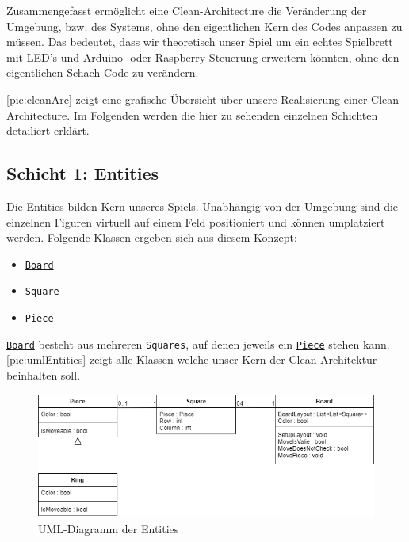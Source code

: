 \documentclass[
10pt, %
a4paper, %
oneside, %
headinclude,footinclude, %
BCOR5mm, %
]{scrartcl}
\begin{document}
\begin{onehalfspace}
Zusammengefasst ermöglicht eine Clean-Architecture die Veränderung der Umgebung, bzw. des Systems, ohne den eigentlichen Kern des Codes anpassen zu müssen.
Das bedeutet, dass wir theoretisch unser Spiel um ein echtes Spielbrett mit LED's und Arduino- oder Raspberry-Steuerung erweitern könnten, ohne den eigentlichen Schach-Code zu verändern.

\autoref{pic:cleanArc} zeigt eine grafische Übersicht über unsere Realisierung einer Clean-Architecture. Im Folgenden werden die hier zu sehenden einzelnen Schichten detailiert erklärt.

\newpage
\subsection{Schicht 1: Entities}
Die Entities bilden Kern unseres Spiels. Unabhängig von der Umgebung sind die einzelnen Figuren virtuell auf einem Feld positioniert und können umplatziert werden.
Folgende Klassen ergeben sich aus diesem Konzept: 

\begin{center}
	\begin{itemize}
		\item \texttt{\href{https://github.com/schmida736/Chess-AdvancedSE/blob/main/Chess-AdvancedSE/Game\%20Elements/Board.cs}{Board}}
		\item \texttt{\href{https://github.com/schmida736/Chess-AdvancedSE/blob/main/Chess-AdvancedSE/Game\%20Elements/Square.cs}{Square}}
		\item \texttt{\href{https://github.com/schmida736/Chess-AdvancedSE/blob/main/Chess-AdvancedSE/Game\%20Elements/Pieces/Piece.cs}{Piece}}
	\end{itemize}
\end{center}

\texttt{\href{https://github.com/schmida736/Chess-AdvancedSE/blob/main/Chess-AdvancedSE/Game\%20Elements/Board.cs}{Board}} besteht aus mehreren \texttt{Squares}, auf denen jeweils ein \texttt{\href{https://github.com/schmida736/Chess-AdvancedSE/blob/main/Chess-AdvancedSE/Game\%20Elements/Pieces/Piece.cs}{Piece}} stehen kann. \autoref{pic:umlEntities} zeigt alle Klassen welche unser Kern der Clean-Architektur beinhalten soll. 
\vspace{0.4cm}
\begin{figure}[h]
	\begin{center}
		\includegraphics[width=13cm]{entities.png}
		\caption{\label{pic:umlEntities} UML-Diagramm der Entities}
	\end{center}
\end{figure}


\end{onehalfspace}
\end{document}
